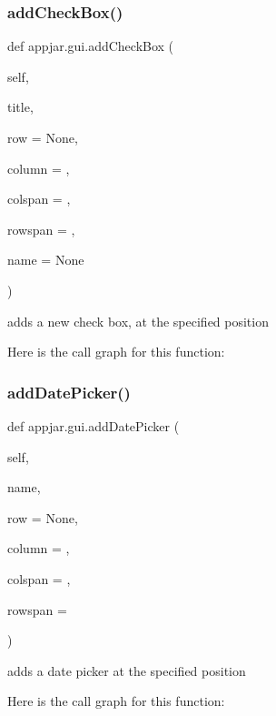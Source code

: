\subsubsection{\texorpdfstring{add\+Check\+Box()}{addCheckBox()}}
{\footnotesize\ttfamily def appjar.\+gui.\+add\+Check\+Box (\begin{DoxyParamCaption}\item[{}]{self,  }\item[{}]{title,  }\item[{}]{row = {\ttfamily None},  }\item[{}]{column = {},  }\item[{}]{colspan = {},  }\item[{}]{rowspan = {},  }\item[{}]{name = {\ttfamily None} }\end{DoxyParamCaption})}

\begin{DoxyVerb}adds a new check box, at the specified position \end{DoxyVerb}
 Here is the call graph for this function\+:
\mbox{\label{classappjar_1_1gui_afd39e0992793b234290b349d7b2240d6}} 
\subsubsection{\texorpdfstring{add\+Date\+Picker()}{addDatePicker()}}
{\footnotesize\ttfamily def appjar.\+gui.\+add\+Date\+Picker (\begin{DoxyParamCaption}\item[{}]{self,  }\item[{}]{name,  }\item[{}]{row = {\ttfamily None},  }\item[{}]{column = {},  }\item[{}]{colspan = {},  }\item[{}]{rowspan = {} }\end{DoxyParamCaption})}

\begin{DoxyVerb}adds a date picker at the specified position \end{DoxyVerb}
 Here is the call graph for this function\+:
\mbox{\label{classappjar_1_1gui_a8e7ec47ea9fe810569b2cd5bb94abdce}} 
